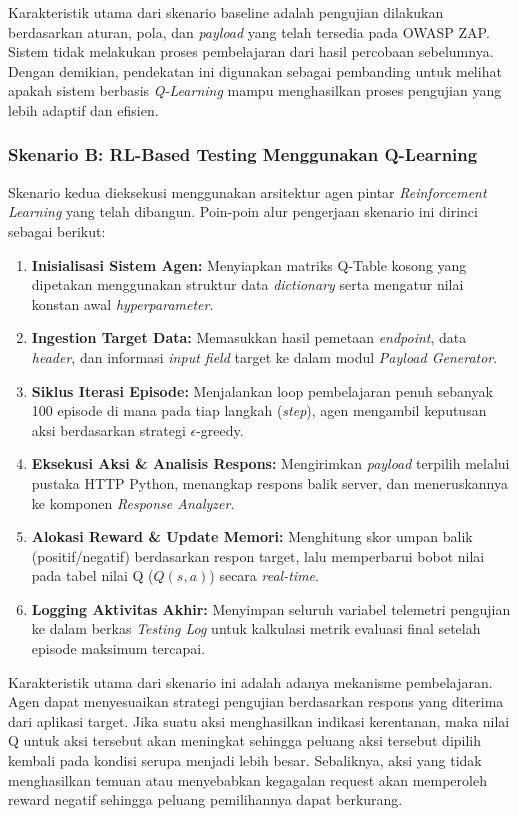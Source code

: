 Karakteristik utama dari skenario baseline adalah pengujian dilakukan berdasarkan aturan, pola, dan \textit{payload} yang telah tersedia pada OWASP ZAP. Sistem tidak melakukan proses pembelajaran dari hasil percobaan sebelumnya. Dengan demikian, pendekatan ini digunakan sebagai pembanding untuk melihat apakah sistem berbasis \textit{Q-Learning} mampu menghasilkan proses pengujian yang lebih adaptif dan efisien.

\subsubsection{Skenario B: RL-Based Testing Menggunakan Q-Learning}

Skenario kedua dieksekusi menggunakan arsitektur agen pintar \textit{Reinforcement Learning} yang telah dibangun. Poin-poin alur pengerjaan skenario ini dirinci sebagai berikut:

\begin{enumerate}
    \item \textbf{Inisialisasi Sistem Agen:} Menyiapkan matriks Q-Table kosong yang dipetakan menggunakan struktur data \textit{dictionary} serta mengatur nilai konstan awal \textit{hyperparameter}.
    \item \textbf{Ingestion Target Data:} Memasukkan hasil pemetaan \textit{endpoint}, data \textit{header}, dan informasi \textit{input field} target ke dalam modul \textit{Payload Generator}.
    \item \textbf{Siklus Iterasi Episode:} Menjalankan loop pembelajaran penuh sebanyak 100 episode di mana pada tiap langkah (\textit{step}), agen mengambil keputusan aksi berdasarkan strategi $\epsilon$-greedy.
    \item \textbf{Eksekusi Aksi \& Analisis Respons:} Mengirimkan \textit{payload} terpilih melalui pustaka HTTP Python, menangkap respons balik server, dan meneruskannya ke komponen \textit{Response Analyzer}.
    \item \textbf{Alokasi Reward \& Update Memori:} Menghitung skor umpan balik (positif/negatif) berdasarkan respon target, lalu memperbarui bobot nilai pada tabel nilai Q ($Q(s,a)$) secara \textit{real-time}.
    \item \textbf{Logging Aktivitas Akhir:} Menyimpan seluruh variabel telemetri pengujian ke dalam berkas \textit{Testing Log} untuk kalkulasi metrik evaluasi final setelah episode maksimum tercapai.
\end{enumerate}

Karakteristik utama dari skenario ini adalah adanya mekanisme pembelajaran. Agen dapat menyesuaikan strategi pengujian berdasarkan respons yang diterima dari aplikasi target. Jika suatu aksi menghasilkan indikasi kerentanan, maka nilai Q untuk aksi tersebut akan meningkat sehingga peluang aksi tersebut dipilih kembali pada kondisi serupa menjadi lebih besar. Sebaliknya, aksi yang tidak menghasilkan temuan atau menyebabkan kegagalan request akan memperoleh reward negatif sehingga peluang pemilihannya dapat berkurang.

